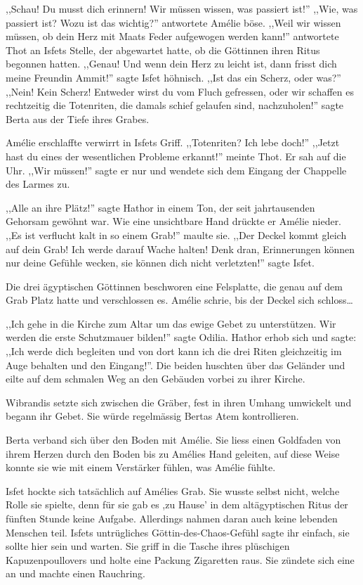 ,,Schau! Du musst dich erinnern! Wir müssen wissen, was passiert ist!'' ,,Wie, was passiert ist? Wozu ist das wichtig?'' antwortete Amélie böse. ,,Weil wir wissen müssen, ob dein Herz mit Maats Feder aufgewogen werden kann!'' antwortete Thot an Isfets Stelle, der abgewartet hatte, ob die Göttinnen ihren Ritus begonnen hatten. ,,Genau! Und wenn dein Herz zu leicht ist, dann frisst dich meine Freundin Ammit!'' sagte Isfet höhnisch. ,,Ist das ein Scherz, oder was?'' ,,Nein! Kein Scherz! Entweder wirst du vom Fluch gefressen, oder wir schaffen es rechtzeitig die Totenriten, die damals schief gelaufen sind, nachzuholen!'' sagte Berta aus der Tiefe ihres Grabes.

Amélie erschlaffte verwirrt in Isfets Griff. ,,Totenriten? Ich lebe doch!'' ,,Jetzt hast du eines der wesentlichen Probleme erkannt!'' meinte Thot. Er sah auf die Uhr. ,,Wir müssen!'' sagte er nur und wendete sich dem Eingang der Chappelle des Larmes zu.

,,Alle an ihre Plätz!'' sagte Hathor in einem Ton, der seit jahrtausenden Gehorsam gewöhnt war. Wie eine unsichtbare Hand drückte er Amélie nieder. ,,Es ist verflucht kalt in so einem Grab!'' maulte sie. ,,Der Deckel kommt gleich auf dein Grab! Ich werde darauf Wache halten! Denk dran, Erinnerungen können nur deine Gefühle wecken, sie können dich nicht verletzten!'' sagte Isfet. 

Die drei ägyptischen Göttinnen beschworen eine Felsplatte, die genau auf dem Grab Platz hatte und verschlossen es. Amélie schrie, bis der Deckel sich schloss\dots

,,Ich gehe in die Kirche zum Altar um das ewige Gebet zu unterstützen. Wir werden die erste Schutzmauer bilden!'' sagte Odilia. Hathor erhob sich und sagte: ,,Ich werde dich begleiten und von dort kann ich die drei Riten gleichzeitig im Auge behalten und den Eingang!''. Die beiden huschten über das Geländer und eilte auf dem schmalen Weg an den Gebäuden vorbei zu ihrer Kirche.

Wibrandis setzte sich zwischen die Gräber, fest in ihren Umhang umwickelt und begann ihr Gebet. Sie würde regelmässig Bertas Atem kontrollieren.

Berta verband sich über den Boden mit Amélie. Sie liess einen Goldfaden von ihrem Herzen durch den Boden bis zu Amélies Hand geleiten, auf diese Weise konnte sie wie mit einem Verstärker fühlen, was Amélie fühlte.

Isfet hockte sich tatsächlich auf Amélies Grab. Sie wusste selbst nicht, welche Rolle sie spielte, denn für sie gab es ,zu Hause' in dem altägyptischen Ritus der fünften Stunde keine Aufgabe. Allerdings nahmen daran auch keine lebenden Menschen teil. Isfets untrügliches Göttin-des-Chaos-Gefühl sagte ihr einfach, sie sollte hier sein und warten. Sie griff in die Tasche ihres plüschigen Kapuzenpoullovers und holte eine Packung Zigaretten raus. Sie zündete sich eine an und machte einen Rauchring. 

